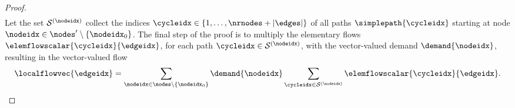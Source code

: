 \documentclass[lettersize,journal]{IEEEtran}
\begin{document}
\begin{proof}
\begin{align}
\end{align}
Let the set $\mathcal{S}^{(\nodeidx)}$ collect the indices $\cycleidx \in \{1,\ldots,\nrnodes+| \edges| \}$ 
of all paths $\simplepath{\cycleidx}$ starting at node $\nodeidx \in \nodes' \setminus \{ \nodeidx_{0} \}$. 
The final step of the proof is to multiply the elementary flows $\elemflowscalar{\cycleidx}{\edgeidx}$, 
for each path $\cycleidx \in \mathcal{S}^{(\nodeidx)}$, with the vector-valued demand $\demand{\nodeidx}$, 
resulting in the vector-valued flow 
\begin{equation} 
\localflowvec{\edgeidx}  = \sum_{\nodeidx \in \nodes \setminus \{\nodeidx_{0}\}} \demand{\nodeidx} \sum_{\cycleidx \in \mathcal{S}^{(\nodeidx)}} \elemflowscalar{\cycleidx}{\edgeidx}.
\end{equation} 
 \end{proof} 
\end{document}
